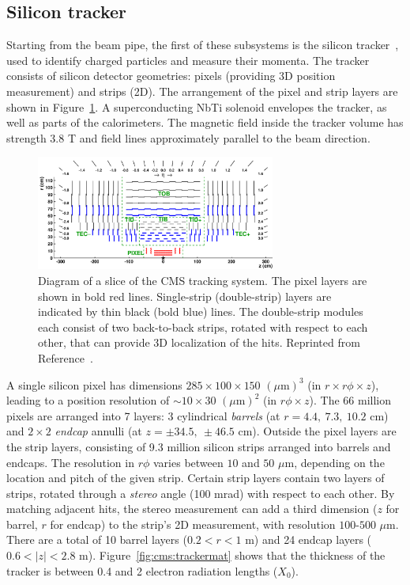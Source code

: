 \subsection{Silicon tracker}
\label{sec:cms:tracker}

Starting from the beam pipe, the first of these subsystems is the silicon tracker~\cite{cmstracker}, used to identify charged particles and measure their momenta. 
The tracker consists of silicon detector geometries: pixels (providing 3D position measurement) and strips (2D). 
The arrangement of the pixel and strip layers are shown in Figure~\ref{fig:cms:si}.
A superconducting NbTi solenoid envelopes the tracker, as well as parts of the calorimeters. 
The magnetic field inside the tracker volume has strength 3.8 T and field lines approximately parallel to the beam direction. 

\begin{figure}[]
    \begin{center} 
        \includegraphics[width=0.7\textwidth]{figures/cms/tracker.png}
        \caption{Diagram of a slice of the CMS tracking system.
                 The pixel layers are shown in bold red lines.
                 Single-strip (double-strip) layers are indicated by thin black (bold blue) lines.
                 The double-strip modules each consist of two back-to-back strips, rotated with respect to each other, that can provide 3D localization of the hits.
                 Reprinted from Reference~\cite{cmstracker}.}
        \label{fig:cms:si}
    \end{center}
\end{figure}


A single silicon pixel has dimensions $285\times100\times150$ $(\mu\mathrm{m})^3$ (in $r\times r\phi\times z$), leading to a position resolution of $\sim10\times30$ $(\mu\mathrm{m})^2$ (in $r\phi\times z$). 
The 66 million pixels are arranged into 7 layers: 3 cylindrical \emph{barrels} (at $r=4.4,~7.3,~10.2$ cm) and $2\times2$ \emph{endcap} annulli (at $z=\pm34.5,~\pm46.5$ cm). 
Outside the pixel layers are the strip layers, consisting of 9.3 million silicon strips arranged into barrels and endcaps.
The resolution in $r\phi$ varies between $10$ and $50$ $\mu$m, depending on the location and pitch of the given strip.
Certain strip layers contain two layers of strips, rotated through a \emph{stereo} angle (100 mrad) with respect to each other.
By matching adjacent hits, the stereo measurement can add a third dimension ($z$ for barrel, $r$ for endcap) to the strip's 2D measurement, with resolution $100$-$500$ $\mu$m.
There are a total of 10 barrel layers ($0.2 < r < 1$ m) and 24 endcap layers ($0.6 < |z| < 2.8$ m). 
Figure~\ref{fig:cms:trackermat} shows that the thickness of the tracker is between 0.4 and 2 electron radiation lengths ($X_0$).

